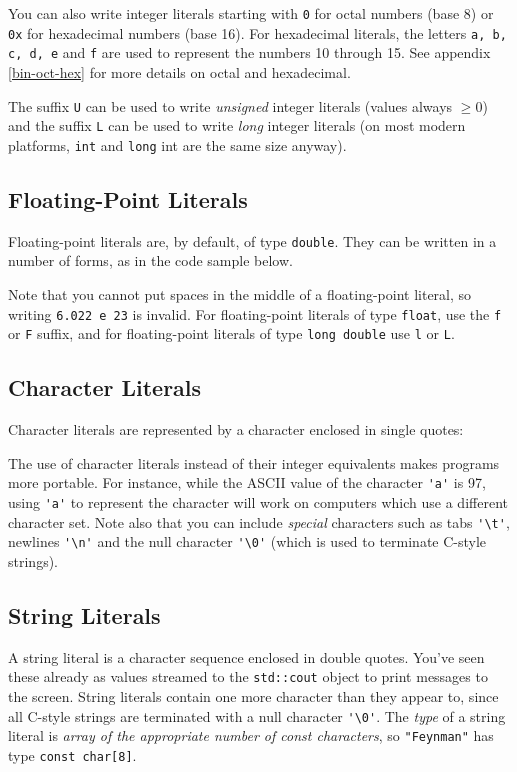 \documentclass[a4paper]{scrartcl}
\begin{document}


You can also write integer literals starting with \texttt{0} for octal numbers (base 8) or \texttt{0x} for hexadecimal numbers (base 16). For hexadecimal literals, the letters \texttt{a, b, c, d, e} and \texttt{f} are used to represent the numbers 10 through 15. See appendix \ref{bin-oct-hex} for more details on octal and hexadecimal.



The suffix \texttt{U} can be used to write \emph{unsigned} integer literals (values always $\ge 0$) and the suffix \texttt{L} can be used to write \emph{long} integer literals (on most modern platforms, \texttt{int} and \texttt{long} int are the same size anyway).

\subsection{Floating-Point Literals}
Floating-point literals are, by default, of type \texttt{double}. They can be written in a number of forms, as in the code sample below.



Note that you cannot put spaces in the middle of a floating-point literal, so writing \texttt{6.022 e 23} is invalid. For floating-point literals of type \texttt{float}, use the \texttt{f} or \texttt{F} suffix, and for floating-point literals of type \texttt{long double} use \texttt{l} or \texttt{L}.

\subsection{Character Literals}
Character literals are represented by a character enclosed in single quotes:



The use of character literals instead of their integer equivalents makes programs more portable. For instance, while the ASCII value of the character \verb|'a'| is 97, using \verb|'a'| to represent the character will work on computers which use a different character set. Note also that you can include \emph{special} characters such as tabs \verb|'\t'|, newlines \verb|'\n'| and the null character \verb|'\0'| (which is used to terminate C-style strings).

\subsection{String Literals}
A string literal is a character sequence enclosed in double quotes. You've seen these already as values streamed to the \texttt{std::cout} object to print messages to the screen. String literals contain one more character than they appear to, since all C-style strings are terminated with a null character \verb|'\0'|. The \emph{type} of a string literal is \emph{array of the appropriate number of \emph{const} characters}, so \texttt{"Feynman"} has type \texttt{const char[8]}.
\end{document}
